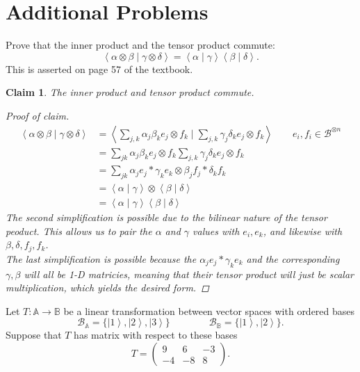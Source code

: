 \documentclass{exam} %
\newcommand{\m}[1]{\mathbb{#1}}    %
\newcommand{\cl}[1]{\mathcal{#1}}  %
\theoremstyle{plain}
\newtheorem{claim}[thm]{Claim}      \newtheorem*{claim*}{Claim}
\theoremstyle{definition}
\theoremstyle{remark}
\newenvironment{claimproof} {
  \begin{proof}[Proof of claim]
  \renewcommand{\qedsymbol}{\ensuremath{\bullet}}
  } {
  \end{proof}
  }
\newcommand{\pmat}[1]{ \begin{pmatrix} #1 \end{pmatrix} }
\numberwithin{equation}{section}  %
\newcommand{\kvect}[1]{ \left| #1 \right> }
\newcommand{\bracket}[2]{ \left< #1 \mid #2 \right> }
\begin{document}
\section{Additional Problems}
\begin{questions}
\question Prove that the inner product and the tensor product commute:
\[
  \bracket{\alpha\otimes \beta}{\gamma\otimes \delta}
  = \bracket{\alpha}{\gamma} \bracket{\beta}{\delta}.
\]
This is asserted on page 57 of the textbook.
  \begin{solution}
  \begin{claim} The inner product and tensor product commute.
    \begin{claimproof}
      \begin{align*}
        \bracket{\alpha\otimes \beta}{\gamma\otimes \delta} 
        &= \bracket{\sum_{j,k} \alpha_j\beta_k e_j \otimes f_k}
        {\sum_{j,k} \gamma_j\delta_k e_j \otimes f_k} \qquad e_i, f_i \in \cl{B}^{\otimes n}\\
        &= \sum_{jk} \alpha_j\beta_k e_j\otimes f_k \sum_{j,k} \gamma_j\delta_k e_j \otimes f_k\\
        &= \sum_{jk} \alpha_je_j*\gamma_ke_k \otimes \beta_jf_j *\delta_k f_k\\
        &= \bracket{\alpha}{\gamma}\otimes\bracket{\beta}{\delta}\\
        &= \bracket{\alpha}{\gamma} \bracket{\beta}{\delta}
      \end{align*}
      The second simplification is possible due to the bilinear nature of the tensor peoduct. This allows
      us to pair the $\alpha$ and $\gamma$ values with $e_i, e_k$, and likewise with $\beta, \delta,
      f_j, f_k$.\\

      The last simplification is possible because the $\alpha_je_j*\gamma_ke_k$ and the corresponding
      $\gamma, \beta$ will all be 1-D matricies, meaning that their tensor product will just be scalar
      multiplication, which yields the desired form.
    \end{claimproof}
  \end{claim}
  \end{solution}

\question Let $T: \m{A}\to\m{B}$ be a linear transformation between vector
spaces with ordered bases
\[
  \cl{B}_{\m{A}}
    = \big\{ \kvect{1}, \kvect{2}, \kvect{3} \big\}
  \qquad\qquad
  \cl{B}_{\m{B}}
    = \big\{ \kvect{1}, \kvect{2} \big\}.
\]
Suppose that $T$ has matrix with respect to these bases
\[
  T
  = \pmat{ 9  & 6  & -3 \\
           -4 & -8 & 8 }.
\]
\begin{parts}

\end{parts}
\end{questions}
\end{document}
